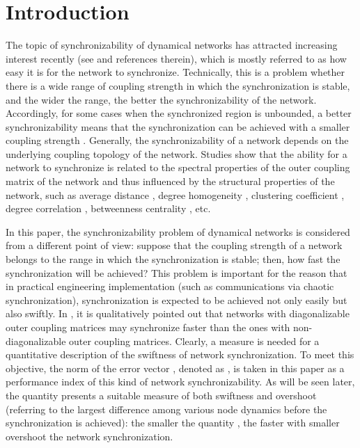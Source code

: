 \documentclass[11pt]{article}
\begin{document}
\abovedisplayskip=0.13cm \abovedisplayshortskip=0.06cm
\belowdisplayskip=0.13cm \belowdisplayshortskip=0.08cm

\def\dis{\displaystyle}




\section{Introduction}

\quad The topic of synchronizability of dynamical networks has
attracted increasing interest recently (see
\cite{bern05,hong04,nish03,wu03,wu05,wu06,zhou06} and references
therein), which is mostly referred to as how easy it is for the
network to synchronize. Technically, this is a problem whether there
is a wide range of coupling strength in which the synchronization is
stable, and the wider the range, the better the synchronizability of
the network. Accordingly, for some cases when the synchronized
region is unbounded, a better synchronizability means that the
synchronization can be achieved with a smaller coupling strength
\cite{wu03}. Generally, the synchronizability of a network depends
on the underlying coupling topology of the network. Studies show
that the ability for a network to synchronize is related to the
spectral properties of the outer coupling matrix of the network
\cite{wu03,wu05} and thus influenced by the structural properties of
the network, such as average distance \cite{zhou06}, degree
homogeneity \cite{nish03}, clustering coefficient \cite{wu06},
degree correlation \cite{bern05}, betweenness centrality
\cite{hong04}, etc.

In this paper, the synchronizability problem of dynamical networks
is considered from a different point of view: suppose that the
coupling strength of a network belongs to the range in which the
synchronization is stable; then, how fast the synchronization will
be achieved? This problem is important for the reason that in
practical engineering implementation (such as communications via
chaotic synchronization), synchronization is expected to be achieved
not only easily but also swiftly. In \cite{nish06}, it is
qualitatively pointed out that networks with diagonalizable outer
coupling matrices may synchronize faster than the ones with
non-diagonalizable outer coupling matrices. Clearly, a measure is
needed for a quantitative description of the swiftness of network
synchronization. To meet this objective, the  norm of the error
vector , denoted as , is taken in this paper as a
performance index of this kind of network synchronizability. As will
be seen later, the quantity  presents a suitable measure of
both swiftness and overshoot (referring to the largest difference
among various node dynamics before the synchronization is achieved):
the smaller the quantity , the faster with smaller
overshoot the network synchronization.
\end{document}
